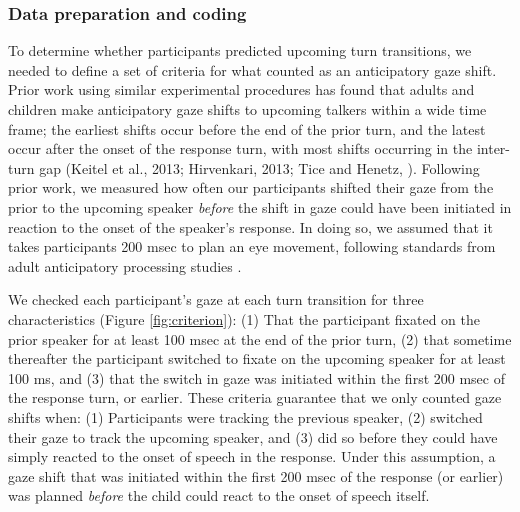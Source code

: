 \documentclass[authoryear, 12pt]{elsarticle}
\begin{document}
\subsubsection{Data preparation and coding}
\label{sec:algorithm}

To determine whether participants predicted upcoming turn transitions, we needed to define a set of criteria for what counted as an anticipatory gaze shift. Prior work using similar experimental procedures has found that adults and children make anticipatory gaze shifts to upcoming talkers within a wide time frame; the earliest shifts occur before the end of the prior turn, and the latest occur after the onset of the response turn, with most shifts occurring in the inter-turn gap (Keitel et al., 2013; Hirvenkari, 2013; Tice and Henetz, \citeyear{TiceHenetz11}). Following prior work, we measured how often our participants shifted their gaze from the prior to the upcoming speaker \textit{before} the shift in gaze could have been initiated in reaction to the onset of the speaker's response. In doing so, we assumed that it takes participants 200 msec to plan an eye movement, following standards from adult anticipatory processing studies \citep[e.g., ][]{kamide2003}.

We checked each participant's gaze at each turn transition for three characteristics (Figure \ref{fig:criterion}): (1) That the participant fixated on the prior speaker for at least 100 msec at the end of the prior turn, (2) that sometime thereafter the participant switched to fixate on the upcoming speaker for at least 100 ms, and (3) that the switch in gaze was initiated within the first 200 msec of the response turn, or earlier. These criteria guarantee that we only counted gaze shifts when: (1) Participants were tracking the previous speaker, (2) switched their gaze to track the upcoming speaker, and (3) did so before they could have simply reacted to the onset of speech in the response. Under this assumption, a gaze shift that was initiated within the first 200 msec of the response (or earlier) was planned \textit{before} the child could react to the onset of speech itself. 
\end{document}
